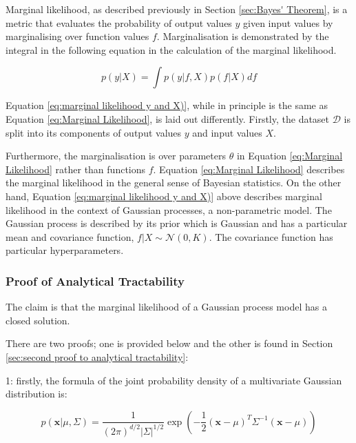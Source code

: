 \documentclass[12pt,a4paper]{article}
\begin{document}
Marginal likelihood, as described previously in Section \ref{sec:Bayes' Theorem}, is a metric that evaluates the probability of output values \(y\) given input values by marginalising over function values \(f\). Marginalisation is demonstrated by the integral in the following equation in the calculation of the marginal likelihood.

\begin{equation}
    p(y | X) = \int p(y | f, X) p(f | X)df
    \label{eq:marginal likelihood y and X)}
\end{equation}

Equation \eqref{eq:marginal likelihood y and X)}, while in principle is the same as Equation \eqref{eq:Marginal Likelihood}, is laid out differently. Firstly, the dataset \(\mathcal{D}\) is split into its components of output values \(y\) and input values \(X\). 

Furthermore, the marginalisation is over parameters \(\theta\) in Equation \eqref{eq:Marginal Likelihood} rather than functions \(f\). Equation \eqref{eq:Marginal Likelihood} describes the marginal likelihood in the general sense of Bayesian statistics. On the other hand, Equation \eqref{eq:marginal likelihood y and X)} above describes marginal likelihood in the context of Gaussian processes, a non-parametric model. The Gaussian process is described by its prior which is Gaussian and has a particular mean and covariance function, \(f | X \sim \mathcal{N}(0, K)\). The covariance function has particular hyperparameters.

\subsubsection{Proof of Analytical Tractability}
\label{sec:proof of analytical}

The  claim is that the marginal likelihood of a Gaussian process model has a closed solution.

There are two proofs; one is provided below and the other is found in Section \ref{sec:second proof to analytical tractability}:

1: firstly, the formula of the joint probability density of a multivariate Gaussian distribution is:

\begin{equation}
p(\mathbf{x} | \mu, \Sigma) = \frac{1}{(2\pi)^{d/2} |\Sigma|^{1/2}} \exp\left( -\frac{1}{2} (\mathbf{x} - \mu)^T \Sigma^{-1} (\mathbf{x} - \mu) \right)
\label{eq:joint pdf gaussian}
\end{equation}
\end{document}
